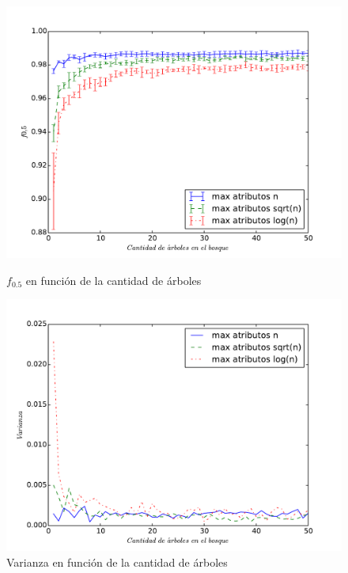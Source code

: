 \begin{figure}[H]
  \centering
  \begin{minipage}[b]{0.45\textwidth}
    \includegraphics[width=\textwidth]{plots/random_forest.pdf}
    \caption{$f_{0.5}$ en función de la cantidad de árboles}
  \end{minipage}
  \hfill
  \begin{minipage}[b]{0.45\textwidth}
    \includegraphics[width=\textwidth]{plots/random_forest_var.pdf}
    \caption{Varianza en función de la cantidad de árboles}
  \end{minipage}
  \label{fig:forest_f05_en_funcion_de_cantidad_de_arboles}
\end{figure}